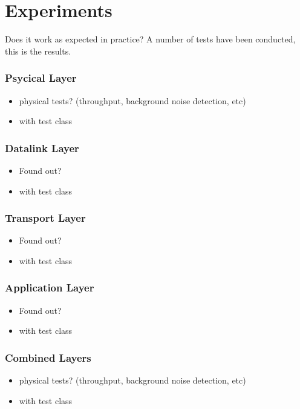 \chapter{Experiments}
Does it work as expected in practice?
A number of tests have been conducted, this is the results.
\subsection{Psycical Layer}

\begin{itemize}
\item physical tests? (throughput, background noise detection, etc)
\item with test class
\end{itemize}

\subsection{Datalink Layer}

\begin{itemize}
\item Found out?
\item with test class
\end{itemize}

\subsection{Transport Layer}

\begin{itemize}
\item Found out?
\item with test class
\end{itemize}

\subsection{Application Layer}

\begin{itemize}
\item Found out?
\item with test class
\end{itemize}

\subsection{Combined Layers}

\begin{itemize}
\item physical tests? (throughput, background noise detection, etc)
\item with test class
\end{itemize}
